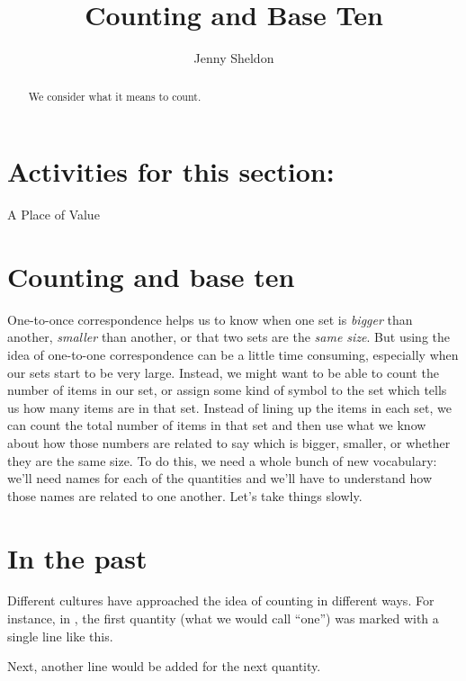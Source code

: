 \documentclass{ximera}
\title{Counting and Base Ten}
\author{Jenny Sheldon}
\begin{document}
\begin{abstract}
We consider what it means to count.
\end{abstract}
\maketitle

\section{Activities for this section:} A Place of Value


\section{Counting and base ten}

One-to-once correspondence helps us to know when one set is {\em bigger} than another, {\em smaller} than another, or that two sets are the {\em same size}. But using the idea of one-to-one correspondence can be a little time consuming, especially when our sets start to be very large. Instead, we might want to be able to count the number of items in our set, or assign some kind of symbol to the set which tells us how many items are in that set. Instead of lining up the items in each set, we can count the total number of items in that set and then use what we know about how those numbers are related to say which is bigger, smaller, or whether they are the same size. To do this, we need a whole bunch of new vocabulary: we'll need names for each of the quantities and we'll have to understand how those names are related to one another. Let's take things slowly.

\section{In the past}

Different cultures have approached the idea of counting in different ways. For instance, in , the first quantity (what we would call ``one'') was marked with a single line like this.

\begin{center}
\textpmhg{\Hone}
\end{center}

Next, another line would be added for the next quantity.

\begin{center}
\textpmhg{\Hone} \textpmhg{\Hone}
\end{center}
\end{document}
